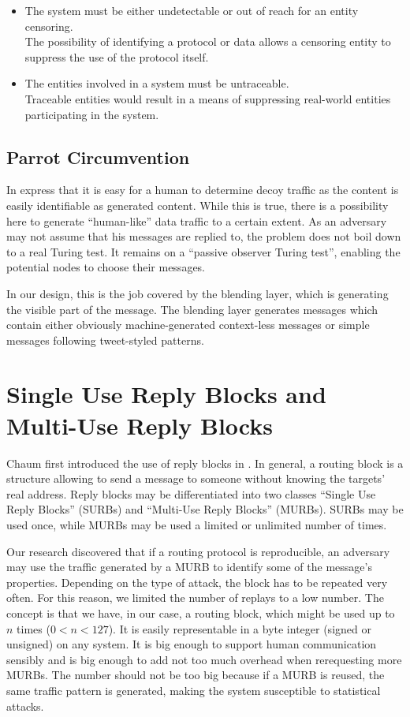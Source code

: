 \begin{itemize}
	\item The system must be either undetectable or out of reach for an entity censoring.\\
	The possibility of identifying a protocol or data allows a censoring entity to suppress the use of the protocol itself. 
	\item The entities involved in a system must be untraceable.\\
	Traceable entities would result in a means of suppressing real-world entities participating in the system.
\end{itemize}

\subsection{Parrot Circumvention}
In \cite{oakland2013-parrot} \citeauthor{oakland2013-parrot} express that it is easy for a human to determine decoy traffic as the content is easily identifiable as generated content. While this is true, there is a possibility here to generate ``human-like'' data traffic to a certain extent. As an adversary may not assume that his messages are replied to, the problem does not boil down to a real Turing test. It remains on a ``passive observer Turing test'', enabling the potential nodes to choose their messages. 

In our design, this is the job covered by the blending layer, which is generating the visible part of the message. The blending layer generates messages which contain either obviously machine-generated context-less messages or simple messages following tweet-styled patterns. 

\section{Single Use Reply Blocks and Multi-Use Reply Blocks}
Chaum first introduced the use of reply blocks in \cite{CHAUM1}. In general, a routing block is a structure allowing to send a message to someone without knowing the targets' real address. Reply blocks may be differentiated into two classes ``Single Use Reply Blocks'' (SURBs)  and ``Multi-Use Reply Blocks'' (MURBs). SURBs may be used once, while MURBs may be used a limited or unlimited number of times. 

Our research discovered that if a routing protocol is reproducible, an adversary may use the traffic generated by a MURB to identify some of the message's properties. Depending on the type of attack, the block has to be repeated very often. For this reason, we limited the number of replays to a low number. The concept is that we have, in our case, a routing block, which might be used up to $n$ times ($0<n<127$). It is easily representable in a byte integer (signed or unsigned) on any system. It is big enough to support human communication sensibly and is big enough to add not too much overhead when rerequesting more MURBs. The number should not be too big because if a MURB is reused, the same traffic pattern is generated, making the system susceptible to statistical attacks.


